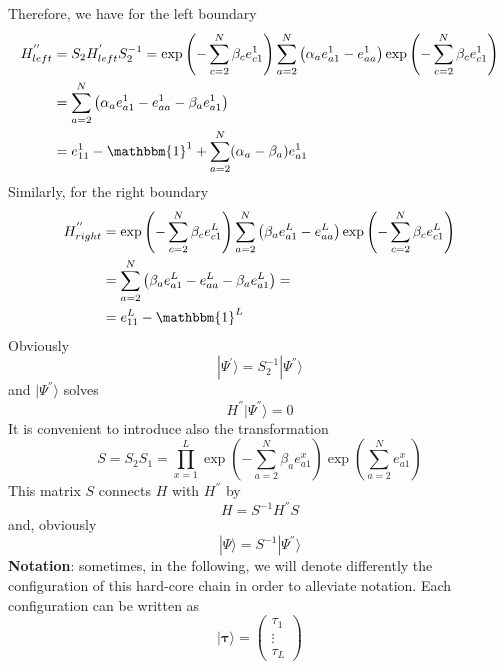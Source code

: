\documentclass[10pt]{article}
\numberwithin{equation}{section}
\numberwithin{equation}{subsection}
\begin{document}
Therefore, we have for the left boundary
\begin{equation}
	\begin{split}
		H_{left}^{''}&=S_{2}H_{left}^{'}S_{2}^{-1}=\exp{\left(-\sum_{c=2}^{N}\beta_{c}e_{c1}^{1}\right)}\sum_{a=2}^{N}\left(\alpha_{a}e_{a1}^{1}-e_{aa}^{1}\right)\exp{\left(-\sum_{c=2}^{N}\beta_{c}e_{c1}^{1}\right)}
		\\&=
		\sum_{a=2}^{N}\left(\alpha_{a}e_{a1}^{1}-e_{aa}^{1}-\beta_{a}e_{a1}^{1}\right)
		\\&=
		e_{11}^{1}-\mathbbm{1}^{1}+\sum_{a=2}^{N}(\alpha_{a}-\beta_{a})e_{a1}^{1}
	\end{split}
\end{equation}
Similarly, for the right boundary
\begin{equation}
	\begin{split}
			H_{right}^{''}&=\exp{\left(-\sum_{c=2}^{N}\beta_{c}e_{c1}^{L}\right)}\sum_{a=2}^{N}\left(\beta_{a}e_{a1}^{L}-e_{aa}^{L}\right)\exp{\left(-\sum_{c=2}^{N}\beta_{c}e_{c1}^{L}\right)}
			\\&=
			\sum_{a=2}^{N}\left(\beta_{a}e_{a1}^{L}-e_{aa}^{L}-\beta_{a}e_{a1}^{L}\right)=
			\\&=
			e_{11}^{L}-\mathbbm{1}^{L}
	\end{split}
\end{equation}
Obviously
\begin{equation}\label{S2-Inverse}
	|\Psi^{'}\rangle = S_{2}^{-1}|\Psi^{''}\rangle
\end{equation}
and $|\Psi^{''}\rangle$ solves
\begin{equation}\label{steadyS-SECOND-def}
	H^{''}|\Psi^{''}\rangle=0
\end{equation}
It is convenient to introduce also the transformation
\begin{equation}\label{similarity}
	S=S_{2}S_{1}=\prod_{x=1}^{L}\exp{\left(-\sum_{a=2}^{N}\beta_{a}e_{a1}^{x}\right)}\exp{\left(\sum_{a=2}^{N}e_{a1}^{x}\right)}
\end{equation}
This matrix $S$ connects $H$ with $H^{''}$ by 
\begin{equation}
H=S^{-1}H^{''}S
\end{equation}
and, obviously
\begin{equation}
	|\Psi\rangle=S^{-1}|\Psi^{''}\rangle
\end{equation}
\textbf{Notation}: sometimes, in the following, we will denote differently the configuration of this hard-core chain in order to alleviate notation. Each configuration can be written as
\begin{equation}
	|\bm{\tau}\rangle =\begin{pmatrix}
		\tau_{1}\\
		\vdots\\
		\tau_{L}
	\end{pmatrix}
\end{equation}
\end{document}
